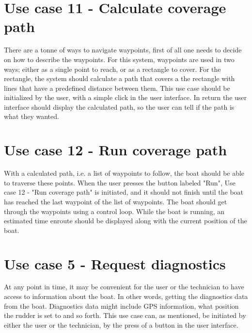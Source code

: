 \section{Use case 11 - Calculate coverage path}
There are a tonne of ways to navigate waypoints, first of all one needs to decide on how to describe the waypoints. For this system, waypoints are used in two ways; either as a single point to reach, or as a rectangle to cover. For the rectangle, the system should calculate a path that covers a the rectangle with lines that have a predefined distance between them. This use case should be initialized by the user, with a simple click in the user interface. In return the user interface should display the calculated path, so the user can tell if the path is what they wanted.

\section{Use case 12 - Run coverage path}
With a calculated path, i.e. a list of waypoints to follow, the boat should be able to traverse these points. When the user presses the button labeled "Run", Use case 12 - "Run coverage path" is initiated, and it should not finish until the boat has reached the last waypoint of the list of waypoints. The boat should get through the waypoints using a control loop. While the boat is running, an estimated time enroute should be displayed along with the current position of the boat.

\section{Use case 5 - Request diagnostics}
At any point in time, it may be convenient for the user or the technician to have access to information about the boat. In other words, getting the diagnostics data from the boat. Diagnostics data might include GPS information, what position the rudder is set to and so forth. This use case can, as mentioned, be initiated by either the user or the technician, by the press of a button in the user interface. 



